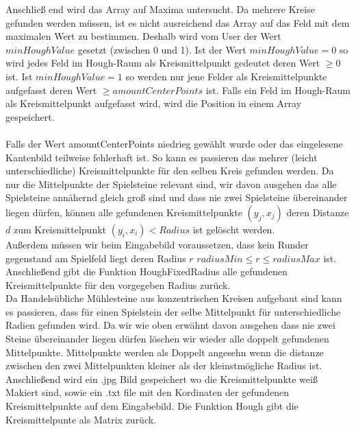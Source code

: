 \documentclass[paper=A4, deutsch]{scrartcl}
\begin{document}
Anschließ end wird das Array auf Maxima untersucht. Da mehrere Kreise gefunden werden müssen, ist es nicht ausreichend das Array auf das Feld mit dem maximalen Wert zu bestimmen. Deshalb wird vom User der Wert \(minHoughValue\) gesetzt (zwischen 0 und 1). Ist der Wert \(minHoughValue = 0\) so wird jedes Feld im Hough-Raum als Kreismittelpunkt gedeutet deren Wert \(\geq 0\) ist. Ist \(minHoughValue = 1\) so werden nur jene Felder als Kreismittelpunkte aufgefasst deren Wert \(\geq amountCenterPoints\) ist.  Falls ein Feld im Hough-Raum als Kreismittelpunkt aufgefasst wird, wird die Position in einem Array gespeichert. \\
\\
Falls der Wert amountCenterPoints niedrieg gewählt wurde oder das eingelesene Kantenbild teilweise fehlerhaft ist. So kann es passieren das mehrer (leicht unterschiedliche) Kreismittelpunkte für den selben Kreis gefunden werden. Da nur die Mittelpunkte der Spielsteine relevant sind, wir davon ausgehen das alle Spielsteine annähernd gleich groß sind und dass nie zwei Spielsteine übereinander liegen dürfen, können alle gefundenen Kreismittelpunkte \((y_{j}, x_{j})\) deren Distanze \(d\) zum Kreismittelpunkt \((y_{i}, x_{i}) < Radius\) ist gelöscht werden. \\

Außerdem müssen wir beim Eingabebild voraussetzen, dass kein Runder gegenstand am Spielfeld liegt deren Radius \(r\)  \(radiusMin \leq r \leq radiusMax\) ist. 
Anschließend gibt die Funktion HoughFixedRadius alle gefundenen Kreismittelpunkte für den vorgegeben Radius zurück. \\

Da Handelsübliche Mühlesteine aus konzentrischen Kreisen aufgebaut sind kann es passieren, dass für einen Spielstein der selbe Mittelpunkt für unterschiedliche Radien gefunden wird.  Da wir wie oben erwähnt davon ausgehen dass nie zwei Steine übereinander liegen dürfen löschen wir wieder alle doppelt gefundenen Mittelpunkte. Mittelpunkte werden als Doppelt angesehn wenn die distanze zwischen den zwei Mittelpunkten kleiner als der kleinstmögliche Radius ist. \\

Anschließend wird ein .jpg Bild gespeichert wo die Kreismittelpunkte weiß Makiert sind, sowie ein .txt file mit den Kordinaten der gefundenen Kreismittelpunkte auf dem Eingabebild. Die Funktion Hough gibt die Kreismittelpunte als Matrix zurück. \\ 
\end{document}
